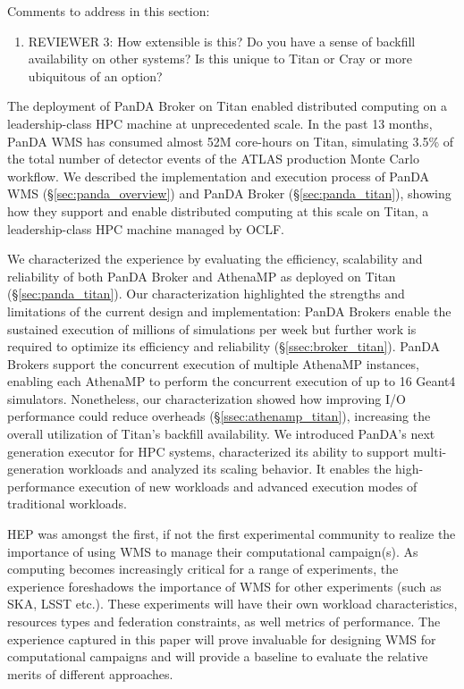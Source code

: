 \ifreview
Comments to address in this section:
\begin{enumerate}
	\item REVIEWER 3: How extensible is this? Do you have a sense of backfill
	availability on other systems? Is this unique to Titan or Cray or more
	ubiquitous of an option?
\end{enumerate}
\fi

The deployment of PanDA Broker on Titan enabled distributed computing on a
leadership-class HPC machine at unprecedented scale. In the past 13 months,
PanDA WMS has consumed almost 52M core-hours on Titan, simulating 3.5\% of
the total number of detector events of the ATLAS production Monte Carlo
workflow. We described the implementation and execution process of PanDA WMS
(\S\ref{sec:panda_overview}) and PanDA Broker (\S\ref{sec:panda_titan}),
showing how they support and enable distributed computing at this scale on
Titan, a leadership-class HPC machine managed by OCLF.

We characterized the experience by evaluating the efficiency, scalability and
reliability of both PanDA Broker and AthenaMP as deployed on Titan
(\S\ref{sec:panda_titan}). Our characterization highlighted the strengths and
limitations of the current design and implementation: PanDA Brokers enable the
sustained execution of millions of simulations per week but further work is
required to optimize its efficiency and reliability
(\S\ref{ssec:broker_titan}). PanDA Brokers support the concurrent execution of
multiple AthenaMP instances, enabling each AthenaMP to perform the concurrent
execution of up to 16 Geant4 simulators. Nonetheless, our characterization
showed how improving I/O performance could reduce overheads
(\S\ref{ssec:athenamp_titan}), increasing the overall utilization of Titan's
backfill availability. We introduced PanDA's next generation executor for HPC
systems, characterized its ability to support multi-generation workloads and
analyzed its scaling behavior. It enables the high-performance execution of
new workloads and advanced execution modes of traditional workloads.


HEP was amongst the first, if not the first experimental community to realize
the importance of using WMS to manage their computational campaign(s). As
computing becomes increasingly critical for a range of experiments, the
experience foreshadows the importance of WMS for other experiments (such as
SKA, LSST etc.).  These experiments will have their own workload
characteristics, resources types and federation constraints, as well metrics
of performance. The experience captured in this paper will prove invaluable
for designing WMS for computational campaigns and will provide a baseline to
evaluate the relative merits of different approaches.

